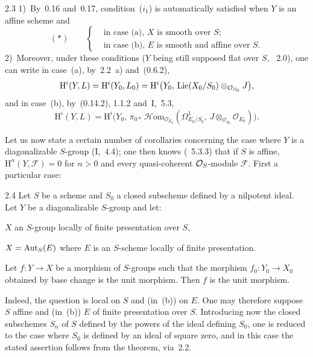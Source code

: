\begin{remark}{2.3}
\label{III.2.3}
1)~By~0.16 and~0.17, condition~($i_{1}$) is automatically satisfied when
\(Y\) is an affine scheme and
\[
(*)\qquad
\left\{
\begin{aligned}
&\text{in case~(a), \(X\) is smooth over \(S\);}\\
&\text{in case~(b), \(E\) is smooth and affine over \(S\).}
\end{aligned}
\right.
\]
2)~Moreover, under these conditions (\(Y\) being still supposed flat over
\(S\), \cf~2.0), one can write in case~(a), by~2.2~a) and~(0.6.2),
\[
\mathrm{H}^{i}(Y,L)=\mathrm{H}^{i}(Y_{0},L_{0})
=\mathrm{H}^{i}\bigl(Y_{0},\,
\operatorname{Lie}(X_{0}/S_{0})\otimes_{\mathcal{O}_{S_{0}}}J\bigr),
\]
{\renewcommand{\thefootnote}{(57)}}
and in case~(b), by~(0.14.2), 1.1.2 and~I,~5.3,
\[
\mathrm{H}^{i}(Y,L)
=\mathrm{H}^{i}\bigl(Y_{0},\,
\pi_{0*}\,\mathcal{H}\mathrm{om}_{\mathcal{O}_{E_{0}}}
  (\Omega^{1}_{E_{0}/S_{0}},\,
   J\otimes_{\mathcal{O}_{S_{0}}}\mathcal{O}_{E_{0}})\bigr).
\]
\end{remark}

Let us now state a certain number of corollaries concerning the case where
\(Y\) is a diagonalizable \(S\)-group (I,~4.4); one then knows
(\loccit~5.3.3) that if \(S\) is affine,
\(\mathrm{H}^{n}(Y,\mathcal{F})=0\) for \(n>0\) and every quasi-coherent
\(\mathcal{O}_S\)-module \(\mathcal{F}\). First a particular case:

\begin{corollary}{2.4}
\label{III.2.4}
Let \(S\) be a scheme and \(S_{0}\) a closed subscheme defined by a nilpotent
ideal. Let \(Y\) be a diagonalizable \(S\)-group and let:
\begin{enumeratea}
\item \(X\) an \(S\)-group locally of finite presentation over \(S\),
\item \(X=\operatorname{Aut}_{S}(E)\) where \(E\) is an \(S\)-scheme locally of finite
presentation.
\end{enumeratea}
Let \(f\colon Y\to X\) be a morphism of \(S\)-groups such that the morphism
\(f_{0}\colon Y_{0}\to X_{0}\) obtained by base change is the unit morphism.
Then \(f\) is the unit morphism.
\end{corollary}

Indeed, the question is local on \(S\) and (in~(b)) on \(E\). One may
therefore suppose \(S\) affine and (in~(b)) \(E\) of finite presentation over
\(S\). Introducing now the closed subschemes \(S_{n}\) of \(S\) defined by
the powers of the ideal defining \(S_{0}\), one is reduced to the case where
\(S_{0}\) is defined by an ideal of square zero, and in this case the stated
assertion follows from the theorem, via~2.2.

